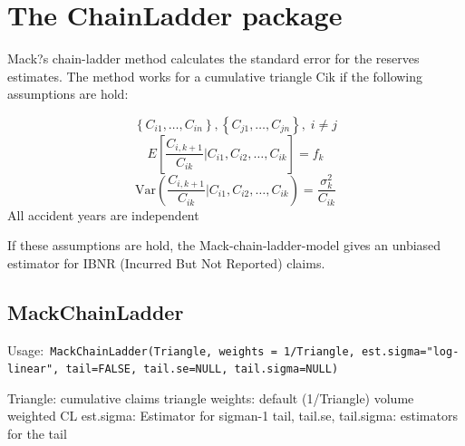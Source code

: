 \documentclass[a4paper]{article}
\begin{document}
\section{The ChainLadder package}

Mack?s chain-ladder method calculates the standard error for the reserves estimates.
The method works for a cumulative triangle Cik if the following assumptions are hold:

$$\left\{ C_{i1},\ldots,C_{in}\right\}, \left\{ C_{j1},\ldots,C_{jn}\right\},\; i \neq j $$%
$$ E\left[ \frac{C_{i,k+1}}{C_{ik}} | C_{i1},C_{i2},\ldots,C_{ik} \right] = f_k$$
$$ \mbox{Var}\left( \frac{C_{i,k+1}}{C_{ik}} | C_{i1},C_{i2},\ldots,C_{ik} \right) = \frac{\sigma_k^2}{C_{ik}}$$
All accident years are independent

If these assumptions are hold, the Mack-chain-ladder-model gives an
unbiased estimator for IBNR (Incurred But Not Reported) claims.

\subsection{MackChainLadder}
Usage:\texttt{
MackChainLadder(Triangle,
    weights = 1/Triangle,
    est.sigma="log-linear",
    tail=FALSE, tail.se=NULL,
    tail.sigma=NULL)
}

Triangle: cumulative claims triangle
weights: default (1/Triangle) volume weighted CL
est.sigma: Estimator for sigman-1
tail, tail.se, tail.sigma: estimators for the tail
\end{document}

